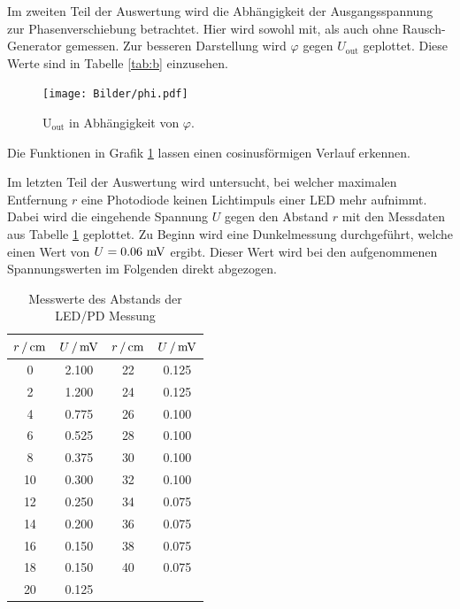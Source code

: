 \newpage

Im zweiten Teil der Auswertung wird die Abhängigkeit der Ausgangsspannung zur Phasenverschiebung
betrachtet. Hier wird sowohl mit, als auch ohne Rausch-Generator gemessen. Zur besseren
Darstellung wird $\varphi$ gegen $U_\text{out}$ geplottet. Diese Werte sind in Tabelle \ref{tab:b} einzusehen.

\begin{figure}[H]
  \centering
  \texttt{[image: Bilder/phi.pdf]}
  \caption{U$_\text{out}$ in Abhängigkeit von $\varphi$.}
  \label{fig:Uout}
\end{figure}

Die Funktionen in Grafik \ref{fig:Uout} lassen einen cosinusförmigen Verlauf erkennen. \\

\newpage


Im letzten Teil der Auswertung wird untersucht, bei welcher maximalen Entfernung $r$
eine Photodiode keinen Lichtimpuls einer LED mehr aufnimmt. Dabei wird die eingehende Spannung $U$
gegen den Abstand $r$ mit den Messdaten aus Tabelle \ref{tab:licht} geplottet.
Zu Beginn wird eine Dunkelmessung durchgeführt, welche einen Wert von $U = 0.06 \,\,\si{\milli\volt}$
ergibt. Dieser Wert wird bei den aufgenommenen Spannungswerten im Folgenden direkt
abgezogen.

\begin{table}[H]
  \centering
    \begin{tabular}{cccc}
      \toprule
      {$r \,/ \,\si{\centi\meter}$} & {$U \, / \,\si{\milli\volt}$} & {$r \,/\,\si{\centi\meter}$} & {$U \,/ \,\si{\milli\volt}$} \\
      \midrule
       0  &  2.100   &   22  &  0.125 \\
       2  &  1.200   &   24  &  0.125 \\
       4  &  0.775   &   26  &  0.100 \\
       6  &  0.525   &   28  &  0.100 \\
       8  &  0.375   &   30  &  0.100 \\
      10  &  0.300   &   32  &  0.100 \\
      12  &  0.250   &   34  &  0.075 \\
      14  &  0.200   &   36  &  0.075 \\
      16  &  0.150   &   38  &  0.075 \\
      18  &  0.150   &   40  &  0.075 \\
      20  &  0.125   &  \hrulefill     &  \hrulefill      \\
      \bottomrule
    \end{tabular}
    \caption{Messwerte des Abstands der LED/PD Messung}
    \label{tab:licht}
\end{table}


